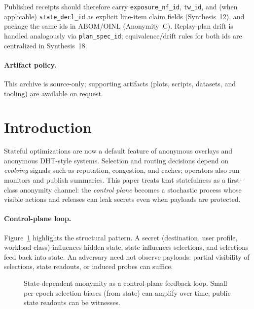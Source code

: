 \documentclass[11pt]{article}
\begin{document}
Published receipts should therefore carry \texttt{exposure\_nf\_id}, \texttt{tw\_id}, and (when applicable) \texttt{state\_decl\_id} as explicit line-item claim fields (Synthesis~12), and package the same ids in ABOM/OINL (Anonymity~C).\cite{series:receiptitems,series:abomoinl}
Replay-plan drift is handled analogously via \texttt{plan\_spec\_id}; equivalence/drift rules for both ids are centralized in Synthesis~18.\cite{series:planstateequiv}

\paragraph{Artifact policy.}
This archive is source-only; supporting artifacts (plots, scripts, datasets, and tooling) are available on request.\cite{series:artifactpolicy}



\section{Introduction}
Stateful optimizations are now a default feature of anonymous overlays and anonymous DHT-style systems.
Selection and routing decisions depend on \emph{evolving} signals such as reputation, congestion, and caches;
operators also run monitors and publish summaries.
This paper treats that statefulness as a first-class anonymity channel: the \emph{control plane} becomes a stochastic process whose visible actions and releases can leak secrets even when payloads are protected.

\paragraph{Control-plane loop.}
Figure~\ref{fig:control-plane-loop} highlights the structural pattern.
A secret (destination, user profile, workload class) influences hidden state, state influences selections, and selections feed back into state.
An adversary need not observe payloads: partial visibility of selections, state readouts, or induced probes can suffice.

\begin{figure}[t]
  \centering
  \caption{State-dependent anonymity as a control-plane feedback loop.
  Small per-epoch selection biases (from state) can amplify over time; public state readouts can be witnesses.
  }
  \label{fig:control-plane-loop}
\end{figure}
\end{document}
